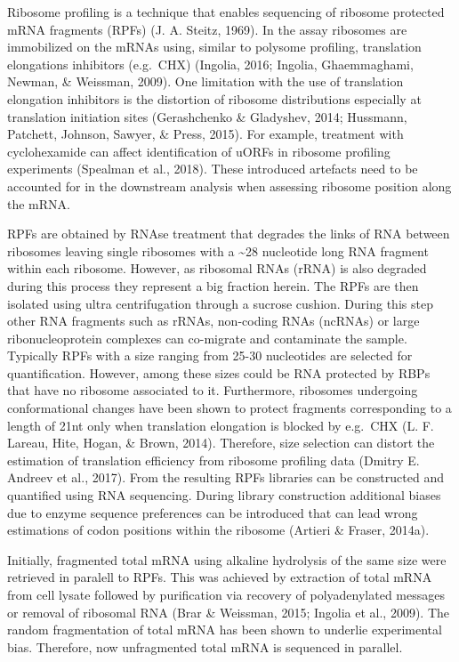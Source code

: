 \documentclass[12pt,openany]{book}
\begin{document}
Ribosome profiling is a technique that enables sequencing of ribosome
protected mRNA fragments (RPFs) (J. A. Steitz, 1969). In the assay
ribosomes are immobilized on the mRNAs using, similar to polysome
profiling, translation elongations inhibitors (e.g.~CHX) (Ingolia, 2016;
Ingolia, Ghaemmaghami, Newman, \& Weissman, 2009). One limitation with
the use of translation elongation inhibitors is the distortion of
ribosome distributions especially at translation initiation sites
(Gerashchenko \& Gladyshev, 2014; Hussmann, Patchett, Johnson, Sawyer,
\& Press, 2015). For example, treatment with cyclohexamide can affect
identification of uORFs in ribosome profiling experiments (Spealman et
al., 2018). These introduced artefacts need to be accounted for in the
downstream analysis when assessing ribosome position along the mRNA.

RPFs are obtained by RNAse treatment that degrades the links of RNA
between ribosomes leaving single ribosomes with a \textasciitilde{}28
nucleotide long RNA fragment within each ribosome. However, as ribosomal
RNAs (rRNA) is also degraded during this process they represent a big
fraction herein. The RPFs are then isolated using ultra centrifugation
through a sucrose cushion. During this step other RNA fragments such as
rRNAs, non-coding RNAs (ncRNAs) or large ribonucleoprotein complexes can
co-migrate and contaminate the sample. Typically RPFs with a size
ranging from 25-30 nucleotides are selected for quantification. However,
among these sizes could be RNA protected by RBPs that have no ribosome
associated to it. Furthermore, ribosomes undergoing conformational
changes have been shown to protect fragments corresponding to a length
of 21nt only when translation elongation is blocked by e.g.~CHX (L. F.
Lareau, Hite, Hogan, \& Brown, 2014). Therefore, size selection can
distort the estimation of translation efficiency from ribosome profiling
data (Dmitry E. Andreev et al., 2017). From the resulting RPFs libraries
can be constructed and quantified using RNA sequencing. During library
construction additional biases due to enzyme sequence preferences can be
introduced that can lead wrong estimations of codon positions within the
ribosome (Artieri \& Fraser, 2014a).

Initially, fragmented total mRNA using alkaline hydrolysis of the same
size were retrieved in paralell to RPFs. This was achieved by extraction
of total mRNA from cell lysate followed by purification via recovery of
polyadenylated messages or removal of ribosomal RNA (Brar \& Weissman,
2015; Ingolia et al., 2009). The random fragmentation of total mRNA has
been shown to underlie experimental bias. Therefore, now unfragmented
total mRNA is sequenced in parallel.
\end{document}
